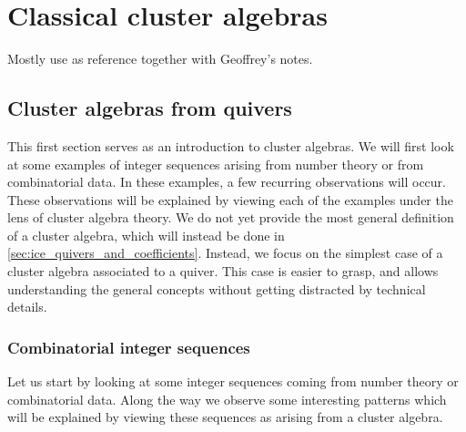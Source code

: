 \chapter{Classical cluster algebras}
Mostly use \cite{FominWilliams2021IntroductionCA_1-3} as reference together with
Geoffrey's notes.

\section{Cluster algebras from quivers}

This first section serves as an introduction to cluster algebras. We will first look at
some examples of integer sequences arising from number theory or from combinatorial
data. In these examples, a few recurring observations will occur. These observations
will be explained by viewing each of the examples under the lens of cluster algebra
theory. We do not yet provide the most general definition of a cluster algebra, which
will instead be done in \cref{sec:ice_quivers_and_coefficients}. Instead, we focus on
the simplest case of a cluster algebra associated to a quiver. This case is easier to
grasp, and allows understanding the general concepts without getting distracted by
technical details.

\subsection{Combinatorial integer sequences}\label{sec:integer_sequences}

Let us start by looking at some integer sequences coming from number theory or
combinatorial data. Along the way we observe some interesting patterns which will be
explained by viewing these sequences as arising from a cluster algebra. \medskip

